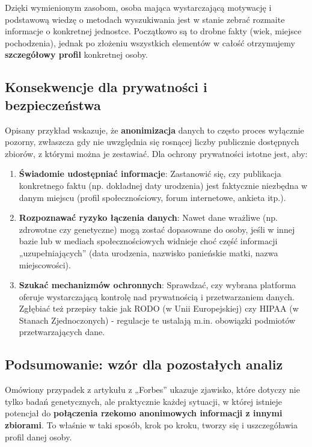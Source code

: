 Dzięki wymienionym zasobom, osoba mająca wystarczającą motywację i podstawową wiedzę o metodach wyszukiwania jest w stanie zebrać rozmaite informacje o konkretnej jednostce. Początkowo są to drobne fakty (wiek, miejsce pochodzenia), jednak po złożeniu wszystkich elementów w całość otrzymujemy \textbf{szczegółowy profil} konkretnej osoby.

\subsection{Konsekwencje dla prywatności i bezpieczeństwa}

Opisany przykład wskazuje, że \textbf{anonimizacja} danych to często proces wyłącznie pozorny, zwłaszcza gdy nie uwzględnia się rosnącej liczby publicznie dostępnych zbiorów, z którymi można je zestawiać. Dla ochrony prywatności istotne jest, aby:

\begin{enumerate}
    \item \textbf{Świadomie udostępniać informacje}: Zastanowić się, czy publikacja konkretnego faktu (np. dokładnej daty urodzenia) jest faktycznie niezbędna w danym miejscu (profil społecznościowy, forum internetowe, ankieta itp.).
    \item \textbf{Rozpoznawać ryzyko łączenia danych}: Nawet dane wrażliwe (np. zdrowotne czy genetyczne) mogą zostać dopasowane do osoby, jeśli w innej bazie lub w mediach społecznościowych widnieje choć część informacji „uzupełniających” (data urodzenia, nazwisko panieńskie matki, nazwa miejscowości).
    \item \textbf{Szukać mechanizmów ochronnych}: Sprawdzać, czy wybrana platforma oferuje wystarczającą kontrolę nad prywatnością i przetwarzaniem danych. Zgłębiać też przepisy takie jak RODO (w Unii Europejskiej) czy HIPAA (w Stanach Zjednoczonych) - regulacje te ustalają m.in. obowiązki podmiotów przetwarzających dane.
\end{enumerate}

\subsection{Podsumowanie: wzór dla pozostałych analiz}

Omówiony przypadek z artykułu z „Forbes” ukazuje zjawisko, które dotyczy nie tylko badań genetycznych, ale praktycznie każdej sytuacji, w której istnieje potencjał do \textbf{połączenia rzekomo anonimowych informacji z innymi zbiorami}. To właśnie w taki sposób, krok po kroku, tworzy się i uszczegóławia profil danej osoby.

